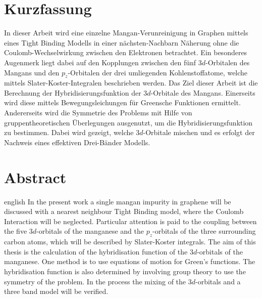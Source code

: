 \thispagestyle{plain}

\section*{Kurzfassung}
In dieser Arbeit wird eine einzelne Mangan-Verunreinigung in Graphen mittels eines Tight Binding Modells in einer nächsten-Nachbarn Näherung
ohne die Coulomb-Wechselwirkung zwischen den Elektronen betrachtet.
Ein besonderes Augenmerk liegt dabei auf den Kopplungen zwischen den fünf $3d$-Orbitalen des Mangans und den $p_z$-Orbitalen der drei umliegenden 
Kohlenstoffatome, welche mittels Slater-Koster-Integralen beschrieben werden.
Das Ziel dieser Arbeit ist die Berechnung der Hybridisierungsfunktion der $3d$-Orbitale des Mangans. 
Einerseits wird diese mittels Bewegungsleichungen für Greensche Funktionen ermittelt.
Andererseits wird die Symmetrie des Problems mit Hilfe von gruppentheoretischen Überlegungen ausgenutzt, um die Hybridisierungsfunktion zu bestimmen.
Dabei wird gezeigt, welche $3d$-Orbitale mischen und es erfolgt der Nachweis eines effektiven Drei-Bänder Modells.
\section*{Abstract}
\begin{foreignlanguage}{english}
In the present work a single mangan impurity in graphene will be discussed with a nearest neighbour Tight Binding model, where
the Coulomb Interaction will be neglected.
Particular attention is paid to the coupling between the five $3d$-orbitals of the manganese and the $p_z$-orbitals of the three
surrounding carbon atoms, which will be described by Slater-Koster integrals.
The aim of this thesis is the calculation of the hybridisation function of the $3d$-orbitals of the manganese.
One method is to use equations of motion for Green's functions. 
The hybridisation function is also determined by involving group theory to use the symmetry of the problem.
In the process the mixing of the $3d$-orbitals and a three band model will be verified. 
\end{foreignlanguage}